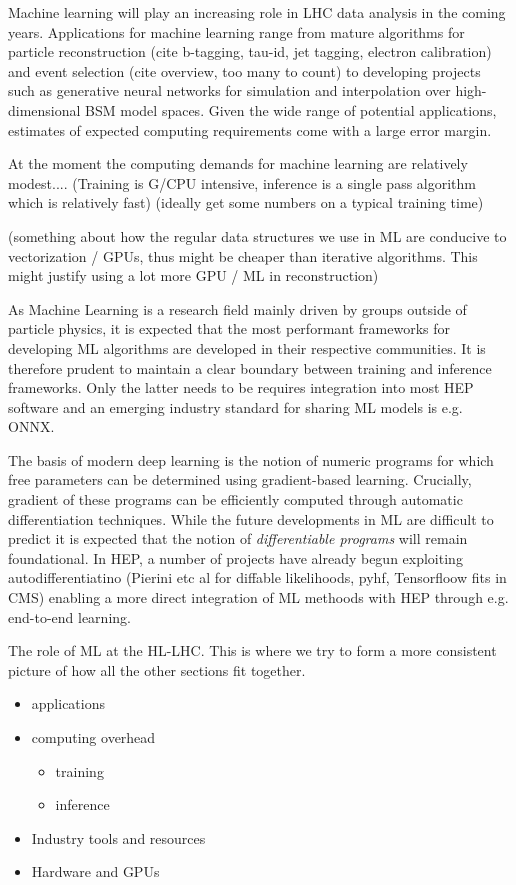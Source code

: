 Machine learning will play an increasing role in LHC data analysis in the coming years. Applications for machine learning range from mature algorithms for particle reconstruction (cite b-tagging, tau-id, jet tagging, electron calibration) and event selection (cite overview, too many to count) to developing projects such as generative neural networks for simulation and interpolation over high-dimensional BSM model spaces. Given the wide range of potential applications, estimates of expected computing requirements come with a large error margin.

At the moment the computing demands for machine learning are relatively modest.... (Training is G/CPU intensive, inference is a single pass algorithm which is relatively fast) (ideally get some numbers on a typical training time)

(something about how the regular data structures we use in ML are conducive to vectorization / GPUs, thus might be cheaper than iterative algorithms. This might justify using a lot more GPU / ML in reconstruction)

As Machine Learning is a research field mainly driven by groups outside of particle physics, it is expected that the most performant frameworks for developing ML algorithms are developed in their respective communities. It is therefore prudent to maintain a clear boundary between training and inference frameworks. Only the latter needs to be requires integration into most HEP software and an emerging industry standard for sharing ML models is e.g. ONNX.



The basis of modern deep learning is the notion of numeric programs for which free parameters can be determined using gradient-based learning. Crucially, gradient of these programs can be efficiently computed through automatic differentiation techniques. While the future developments in ML are difficult to predict it is expected that the notion of \emph{differentiable programs} will remain foundational. In HEP, a number of projects have already begun exploiting autodifferentiatino (Pierini etc al for diffable likelihoods, pyhf, Tensorfloow fits in CMS) enabling a more direct integration of ML methoods with HEP through e.g. end-to-end learning.

The role of ML at the HL-LHC. This is where we try to form a more consistent picture of how all the other sections fit together.
\begin{itemize}
    \item applications
    \item computing overhead
    \begin{itemize}
        \item training
        \item inference
    \end{itemize}
    \item Industry tools and resources
    \item Hardware and GPUs
\end{itemize}